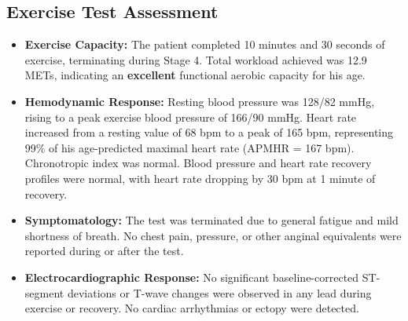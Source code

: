 \subsection{Exercise Test Assessment}
\begin{itemize}
    \item \textbf{Exercise Capacity:} The patient completed 10 minutes and 30 seconds of exercise, terminating during Stage 4. Total workload achieved was 12.9 METs, indicating an \textbf{excellent} functional aerobic capacity for his age.
    \item \textbf{Hemodynamic Response:} Resting blood pressure was 128/82 mmHg, rising to a peak exercise blood pressure of 166/90 mmHg. Heart rate increased from a resting value of 68 bpm to a peak of 165 bpm, representing 99\% of his age-predicted maximal heart rate (APMHR = 167 bpm). Chronotropic index was normal. Blood pressure and heart rate recovery profiles were normal, with heart rate dropping by 30 bpm at 1 minute of recovery.
    \item \textbf{Symptomatology:} The test was terminated due to general fatigue and mild shortness of breath. No chest pain, pressure, or other anginal equivalents were reported during or after the test.
    \item \textbf{Electrocardiographic Response:} No significant baseline-corrected ST-segment deviations or T-wave changes were observed in any lead during exercise or recovery. No cardiac arrhythmias or ectopy were detected.
\end{itemize}
